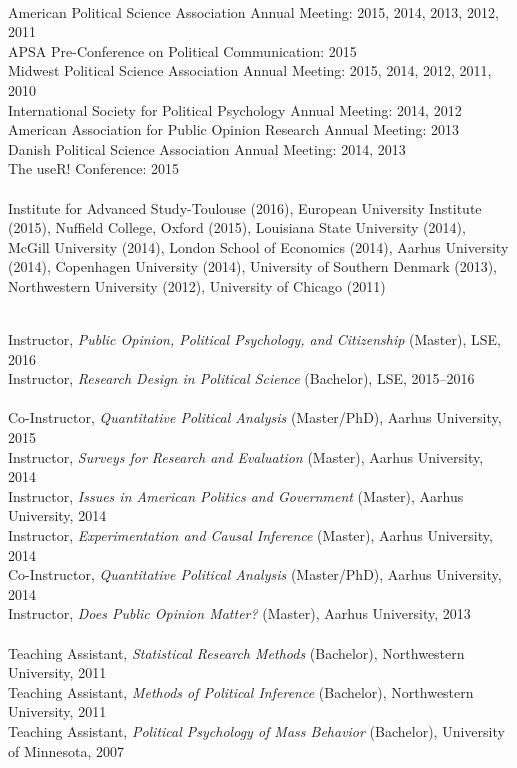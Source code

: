 \documentclass[12pt]{article}
\renewcommand{\section}[1]{\pagebreak[3]%
    \llap{\scshape\smash{\parbox[t]{\marginparwidth}{\raggedright {\color{lg}#1}}}}%
    \vspace{-\baselineskip}\par}
\newcommand{\topic}[1]{\pagebreak[3]\indent {\color{lg}{\footnotesize #1 }}\\}
\newcommand{\entry}[1]{\indent {\color{lg}\guillemotright}\hspace{2pt}#1\vspace{.25em}\\}
\begin{document}
\section{Conference\\Papers\\and\\Invited\\Presentations}
\topic{Conference Papers}
\entry{American Political Science Association Annual Meeting: 2015, 2014, 2013, 2012, 2011}
\entry{APSA Pre-Conference on Political Communication: 2015}
\entry{Midwest Political Science Association Annual Meeting: 2015, 2014, 2012, 2011, 2010}
\entry{International Society for Political Psychology Annual Meeting: 2014, 2012}
\entry{American Association for Public Opinion Research Annual Meeting: 2013}
\entry{Danish Political Science Association Annual Meeting: 2014, 2013}
\entry{The useR! Conference: 2015}

\topic{Invited Presentations}
\entry{Institute for Advanced Study-Toulouse (2016), European University Institute (2015), Nuffield College, Oxford (2015), Louisiana State University (2014), McGill University (2014), London School of Economics (2014), Aarhus University (2014), Copenhagen University (2014), University of Southern Denmark (2013), Northwestern University (2012), University of Chicago (2011)}


\section{Teaching and Advising}
\topic{Experience: London School of Economics and Political Science}
\entry{Instructor, {\em Public Opinion, Political Psychology, and Citizenship} (Master), LSE, 2016}
\entry{Instructor, {\em Research Design in Political Science} (Bachelor), LSE, 2015--2016}
\topic{Experience: Aarhus University}
\entry{Co-Instructor, {\em Quantitative Political Analysis} (Master/PhD), Aarhus University, 2015}
\entry{Instructor, {\em Surveys for Research and Evaluation} (Master), Aarhus University, 2014}
\entry{Instructor, {\em Issues in American Politics and Government} (Master), Aarhus University, 2014}
\entry{Instructor, {\em Experimentation and Causal Inference} (Master), Aarhus University, 2014}
\entry{Co-Instructor, {\em Quantitative Political Analysis} (Master/PhD), Aarhus University, 2014}
\entry{Instructor, {\em Does Public Opinion Matter?} (Master), Aarhus University, 2013}
\topic{Experience: Northwestern University}
\entry{Teaching Assistant, {\em Statistical Research Methods} (Bachelor), Northwestern University, 2011} %
\entry{Teaching Assistant, {\em Methods of Political Inference} (Bachelor), Northwestern University, 2011} %
\entry{Teaching Assistant, {\em Political Psychology of Mass Behavior} (Bachelor), University of Minnesota, 2007} %
\end{document}
